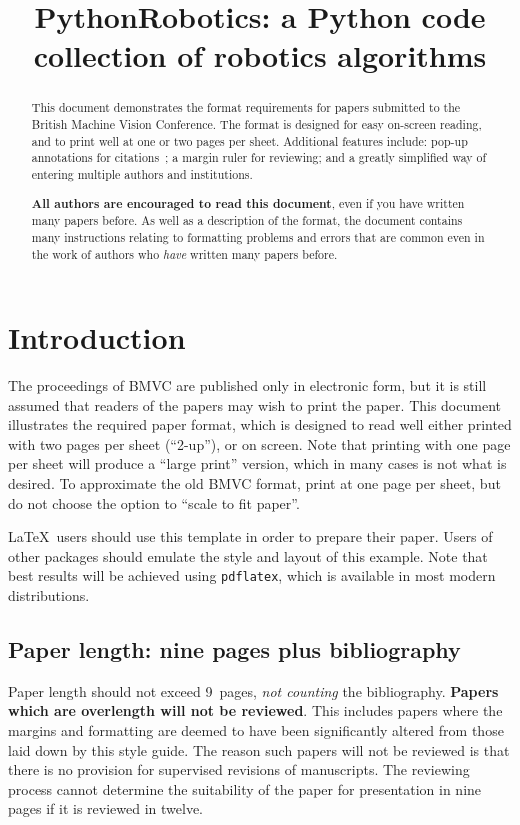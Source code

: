 \documentclass{bmvc2k}
\title{PythonRobotics: a Python code collection of robotics algorithms}
\begin{document}
\maketitle

\begin{abstract}
This document demonstrates the format requirements for papers submitted
to the British Machine Vision Conference.  The format is designed for
easy on-screen reading, and to print well at one or two pages per sheet.
Additional features include: pop-up annotations for
citations~\cite{Authors06,Mermin89}; a margin ruler for reviewing; and a
greatly simplified way of entering multiple authors and institutions.

{\bf All authors are encouraged to read this document}, even if you have
written many papers before.  As well as a description of the format, the
document contains many instructions relating to formatting problems and
errors that are common even in the work of authors who {\em have}
written many papers before.
\end{abstract}

\section{Introduction}
\label{sec:intro}
The proceedings of BMVC are published only in electronic form, but it is still assumed
that readers of the papers may wish to print the paper.   This document
illustrates the required paper format, which is designed to read well either printed
with two pages per sheet (``2-up''), or on screen.  Note that printing with one page 
per sheet will produce a ``large print'' version, which in many cases is not what is desired.
To approximate the old BMVC format, print at one page per sheet, but do not choose
the option to ``scale to fit paper''.

\LaTeX\ users should use this template in order to prepare their paper.
Users of other packages should emulate the style and layout of this
example.  Note that best results will be achieved using {\tt pdflatex},
which is available in most modern distributions.

\subsection{Paper length: nine pages plus bibliography}
Paper length should not exceed 9~pages, {\em not counting} the bibliography.  {\bf Papers which are
 overlength will not be reviewed}.  This includes papers where the
margins and formatting are deemed to have been significantly altered from
those laid down by this style guide.  The reason such papers will not be
reviewed is that there is no provision for supervised revisions of
manuscripts.  The reviewing process cannot determine the suitability of the
paper for presentation in nine pages if it is reviewed in twelve.
\end{document}
